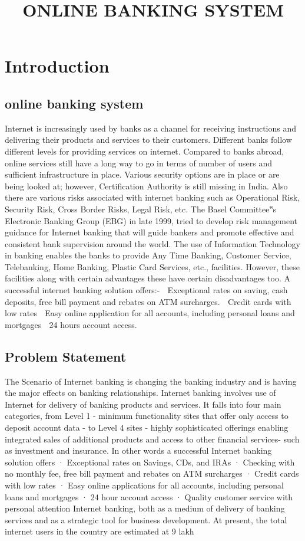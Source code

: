 \documentclass[]{report}
\title{ONLINE BANKING SYSTEM}
\begin{document}
	\maketitle
	
\chapter*{Introduction}
\section*{online banking system}
Internet is increasingly used by banks as a channel for receiving instructions and delivering their products and services to their customers. Different banks follow different levels for providing services on internet. Compared to banks abroad, online services still have a long way to go in terms of number of users and sufficient infrastructure in place. Various security options are in place or are being looked at; however, Certification Authority is still missing in India. Also there are various risks associated with internet banking such as Operational Risk, Security Risk, Cross Border Risks, Legal Risk, etc. The Basel Committee‟s Electronic Banking Group (EBG) in late 1999, tried to develop risk management guidance for Internet banking that will guide bankers and promote effective and consistent bank supervision around the world. The use of Information Technology in banking enables the banks to provide Any Time Banking, Customer Service, Telebanking, Home Banking, Plastic Card Services, etc., facilities. However, these facilities along with certain advantages these have certain disadvantages too. A successful internet banking solution offers:-  Exceptional rates on saving, cash deposits, free bill payment and rebates on ATM surcharges.  Credit cards with low rates  Easy online application for all accounts, including personal loans and mortgages  24 hours account access. 
\section*{Problem Statement}
The Scenario of Internet banking is changing the banking industry and is having the major effects on banking relationships. Internet banking involves use of Internet for delivery of banking products and services. It falls into four main categories, from Level 1 - minimum functionality sites that offer only access to deposit account data - to Level 4 sites - highly sophisticated offerings enabling integrated sales of additional products and access to other financial services- such as investment and insurance. In other words a successful Internet banking solution offers · Exceptional rates on Savings, CDs, and IRAs · Checking with no monthly fee, free bill payment and rebates on ATM surcharges · Credit cards with low rates · Easy online applications for all accounts, including personal loans and mortgages · 24 hour account access · Quality customer service with personal attention Internet banking, both as a medium of delivery of banking services and as a strategic tool for business development. At present, the total internet users in the country are estimated at 9 lakh
\end{document}
